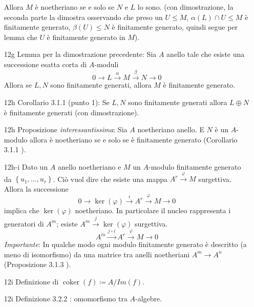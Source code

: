\documentclass[italian]{article}
\begin{document}
\begin{enumerate}
\begin{equation*}
        \end{equation*}
        Allora $M$ è noetheriano se e solo se $N$ e $L$ lo sono.
        (con dimostrazione, la seconda parte la dimostra osservando che preso un
          $U \le M$, $\alpha(L) \cap U \le M$ è finitamente generato,
          $\beta(U) \le N$ è finitamente generato, quindi segue per lemma che $U$ 
          è finitamente generato in $M$).
      \item[12g] Lemma per la dimostrazione precedente: Sia $A$ anello tale che
        esiste una successione esatta corta di $A$-moduli
        \begin{equation*}
          0 \to L \xrightarrow{\alpha} M \xrightarrow{\beta}
            N \to 0
        \end{equation*}
        Allora se $L, N$ sono finitamente generati, allora $M$ è finitamente
        generato.
      \item[12h] Corollario 3.1.1 (punto 1): Se $L,N$ sono finitamente generati 
      	allora $L \oplus N$ è finitamente generati (con dimostrazione).
      \item[12h] Proposizione \emph{interessantissima}: Sia $A$ noetheriano
        anello. E $N$ è un $A$-modulo allora è noetheriano se e solo se
        è finitamente generato (Corollario 3.1.1 \cite{vergura}). 
      \item[12h-i] Dato un $A$ anello noetheriano e $M$ un $A$-modulo finitamente
        generato da $\left\{ u_1, \dots, u_r \right\}$. Ciò vuol dire che esiste
        una mappa $A^r \xrightarrow{\varphi} M$ surgettiva. Allora la
        successione 
        \begin{equation*}
          0 \to \ker(\varphi) \xrightarrow{i} A^r \xrightarrow{\varphi} M \to 0
        \end{equation*}
        implica che $\ker(\varphi)$ noetheriano. In particolare il nucleo
        rappresenta i generatori di $A^m$; esiste $A^m \xrightarrow{j}
        \ker(\varphi)$ surgettiva. 
        \begin{equation*}
          A^m \xrightarrow{j \circ i} A^r \xrightarrow{\varphi} M \to 0
        \end{equation*}
        \emph{Importante}: In qualche modo ogni modulo finitamente generato è 
        descritto (a meno di isomorfismo) da una matrice tra anelli 
        noetheriani $A^m \to A^n$ (Proposizione 3.1.3 \cite{vergura}). 
      \item[12i] Definizione di $\operatorname{coker}(f) \coloneqq A / Im(f)$. 
      \item[12i] Definizione 3.2.2 \cite{vergura}: omomorfismo tra $A$-algebre.

\end{enumerate}
\end{document}
